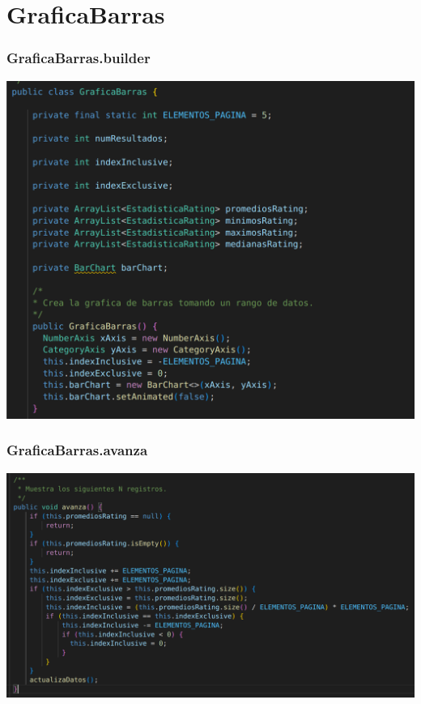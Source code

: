 \documentclass{beamer}
\begin{document}
\section{GraficaBarras}

\begin{frame}
\frametitle{GraficaBarras.builder}
\includegraphics[width=\linewidth]{graficabarras_builder}
\end{frame}

\begin{frame}
\frametitle{GraficaBarras.avanza}
\includegraphics[width=\linewidth]{graficabarras_avanza}
\end{frame}
\end{document}
